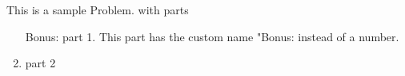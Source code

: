 \begin{problem}
This is a sample Problem. with parts
\begin{enumerate}
\item[Bonus:] part 1. This part has the custom name "Bonus:
 instead of a number.
\item part 2
\end{enumerate}
\end{problem}

\begin{solution}
  
\end{solution}

 	

